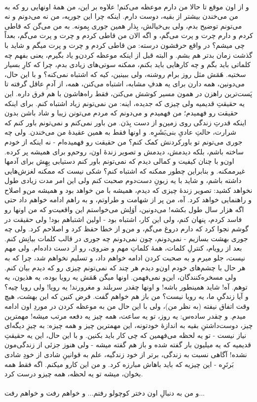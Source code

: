 \documentclass[12pt]{book}
\begin{document}
    \paragraph{}
    و از اون موقع تا حالا من دارم موعظه می‌کنم! علاوه بر این، من همهٔ اونهایی رو که به من می‌خندن بیشتر از بقیه، دوست دارم. اینکه چرا این جوریه، من نه می‌دونم و نه می‌تونم توضیح بدم، ولی بی‌خیالش، بِذار همین جوری بِمونه. به من می‌گن که قاطی کردم و دارم چرت و پرت می‌گم، و اگه الان من قاطی کردم و چرت و پرت می‌گم، بعداً چی میشم؟ در واقع حرفشون درسته: من قاطی کردم و چرت و پرت میگم و شاید با گذشت زمان بدتر هم بشم. و البته قبل از اینکه موعظه کردن‌و یاد بگیرم، یعنی بفهم چه کلماتی باید بگم و چه کارهایی باید بکنم، ممکنه سوتی‌های زیادی بدم، چرا که کارِ بسیار سختیه. هَمَش مثل روز برام روشنه، ولی ببینین، کیه که اشتباه نمی‌کنه؟ و با این حال، می‌دونین، همه دارن برای یه هدفِ مشابه، اشتباه می‌کنن، همه، از آدمِ عاقل گرفته تا پَست‌ترین راهزن در همون مسیر کوشش می‌کنن، فقط راه‌هاشون با هم فرق داره. این یه حقیقتِ قدیمیه ولی چیزی که جدیده، اینه: من نمی‌تونم زیاد اشتباه کنم. برای اینکه حقیقت رو فهمیدم؛ من فهمیدم و می‌دونم که مردم می‌تونن زیبا و شاد باشن بدون اینکه قدرتِ زندگی روی زمین‌و از دست بِدَن. من باور نمی‌کنم و نمی‌تونم باور کنم که شرارت، حالتِ عادیِ بنی‌بَشَرِه. و اونها فقط به همین عقیدهٔ من می‌خندن. ولی چه جوری می‌تونم تو باورکردنش کمک کنم؟ من حقیقت رو فهمیده‌ام - نه اینکه از خودم ساخته باشم، بلکه دیدمش، دیدمش و تصویر زندهٔ اون، روحم‌و برای همیشه پر کرده. اون‌و با چنان کیفیت و کمالی دیدم که نمی‌تونم باور کنم دستیابی بِهِش برای آدمها غیرممکنه. و بنابراین چطور ممکنه که اشتباه کنم؟ شکی نیست که ممکنه لغزش‌هایی داشته باشم، و شاید با یه زبونِ دست‌دوم صحبت کنم ولی این امر مدت زیادی طول نخواهد کشید: تصویر زندهٔ چیزی که دیدم، همیشه با من خواهد بود و همیشه من‌و اصلاح و راهنمایی خواهد کرد. آه، من پر از شهامت و طراوتم، و به راهم ادامه خواهم داد حتی اگه هزار سال طول بکشه! می‌دونین، اَوَلِش می‌خواستم این واقعیت‌و که من اونها رو فاسد کردم، پنهان کنم، ولی این کار، اشتباه بود - اولین اشتباهم بود! ولی حقیقت در گوشم نجوا کرد که دارم دروغ می‌گم، و من‌و از خطا حفظ کرد و اصلاحم کرد. ولی چه جوری بهشت بسازیم - نمی‌دونم، چون نمی‌دونم چه جوری در قالب کلمات بیانِش کنم. بعد از رویام، کنترلِ کلمات، همهٔ کلماتِ مهم و ضروی، رو از دست داده‌ام. ولی مهم نیست، جلو میرم و به صحبت کردن ادامه خواهم داد، و تسلیم نخواهم شد، چرا که به هر حال با چشم‌های خودم اون‌و دیدم هر چند که نمی‌تونم چیزی رو که دیدم بیان کنم. ولی مسخره‌کنندگان، این‌و نمی‌فهمن. اونها میگن هَمَش یه رویا بوده، یه هذیون، یه توهم. آه! شاید همینطور باشه! و اونها چقدر سربلند و مغرورند! یه رویا! ولی رویا چیه؟ و آیا زندگیِ ما، یه رویا نیست؟ من باز هم خواهم گفت. فرض کنین که این بهشت، هیچ وقت اتفاق نیفته (به نظر من)، ولی با این حال من به موعظه کردن در موردِ اون ادامه میدم. و چقدر ساده‌س: یه روز، تو یه ساعت، همه چیز یه دفعه مرتب میشه! مهمترین چیز، دوست‌داشتنِ بقیه به اندازهٔ خودتونه، این مهمترین چیز و همه چیزه: به چیزِ دیگه‌ای نیاز نیست - تو یه لحظه می‌فهمین که چی کار باید بکنین. و با این حال، این یه حقیقتِ قدیمیه که یه میلیون بار گفته شده و باز هم گفته میشه - ولی هنوز جزئی از زندگی‌مون نشده! آگاهی نسبت به زندگی، برتر از خود زندگیه، علم به قوانینِ شادی از خودِ شادی بَرتَرِه - این چیزیه که باید باهاش مبارزه کرد. و من این کارو میکنم. اگه فقط همه بخوان، میشه تو یه لحظه، همه چیزو درست کرد.

    \paragraph{}
    و من به دنبالِ اون دختر کوچولو رفتم... و خواهم رفت و خواهم رفت...
\end{document}
